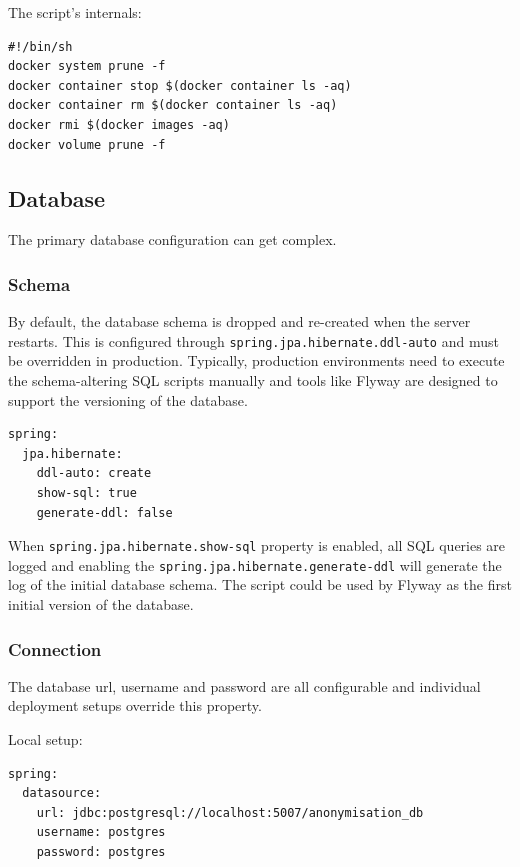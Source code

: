 \documentclass[a4paper,twoside,12pt]{book}
\begin{document}
The script's internals:
\begin{verbatim}
#!/bin/sh
docker system prune -f
docker container stop $(docker container ls -aq)
docker container rm $(docker container ls -aq)
docker rmi $(docker images -aq)
docker volume prune -f
\end{verbatim}


\subsection{Database}

The primary database configuration can get complex.

\subsubsection{Schema}

By default, the database schema is dropped and re-created when the server restarts. This is configured through \verb|spring.jpa.hibernate.ddl-auto| and must be overridden in production. Typically, production environments need to execute the schema-altering SQL scripts manually and tools like Flyway \cite{bib:flyway} are designed to support the versioning of the database.

\begin{verbatim}
spring:
  jpa.hibernate:
    ddl-auto: create
    show-sql: true
    generate-ddl: false
\end{verbatim}


When \verb|spring.jpa.hibernate.show-sql| property is enabled, all SQL queries are logged and enabling the \verb|spring.jpa.hibernate.generate-ddl| will generate the log of the initial database schema. The script could be used by Flyway as the first initial version of the database.

\subsubsection{Connection}

The database url, username and password are all configurable and individual deployment setups override this property.

Local setup:

\begin{verbatim}
spring:
  datasource:
    url: jdbc:postgresql://localhost:5007/anonymisation_db
    username: postgres
    password: postgres
\end{verbatim}
\end{document}
